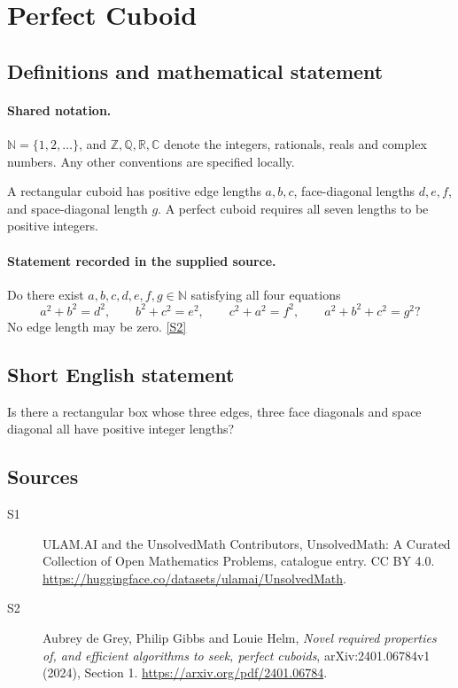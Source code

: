 \documentclass[11pt]{article}
\newcommand{\sref}[2]{\hyperlink{source:#1:#2}{[S#2]}}
\begin{document}
\section{Perfect Cuboid}\label{statement}

\subsection{Definitions and mathematical statement}

\paragraph{Shared notation.}$\mathbb N=\{1,2,\ldots\}$, and $\mathbb Z,\mathbb Q,\mathbb R,\mathbb C$ denote the integers, rationals, reals and complex numbers. Any other conventions are specified locally.


A rectangular cuboid has positive edge lengths $a,b,c$, face-diagonal lengths $d,e,f$, and space-diagonal length $g$. A perfect cuboid requires all seven lengths to be positive integers.
\paragraph{Statement recorded in the supplied source.}
Do there exist $a,b,c,d,e,f,g\in\mathbb N$ satisfying all four equations
\[
a^2+b^2=d^2,\qquad b^2+c^2=e^2,\qquad c^2+a^2=f^2,\qquad a^2+b^2+c^2=g^2?
\]
No edge length may be zero. \sref{statement}{2}

\subsection{Short English statement}
Is there a rectangular box whose three edges, three face diagonals and space diagonal all have positive integer lengths?
\subsection{Sources}
\begin{description}
\item[\hypertarget{source:statement:1}{S1}] ULAM.AI and the UnsolvedMath Contributors, UnsolvedMath: A Curated Collection of Open Mathematics Problems, catalogue entry. CC BY 4.0. \url{https://huggingface.co/datasets/ulamai/UnsolvedMath}.
\item[\hypertarget{source:statement:2}{S2}] Aubrey de Grey, Philip Gibbs and Louie Helm, \emph{Novel required properties of, and efficient algorithms to seek, perfect cuboids}, arXiv:2401.06784v1 (2024), Section 1. \url{https://arxiv.org/pdf/2401.06784}.
\end{description}
\label{end:statement}
\end{document}
